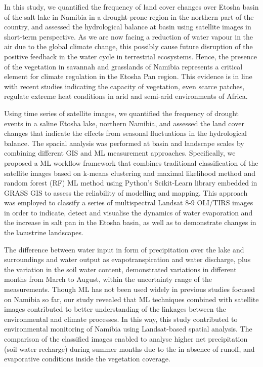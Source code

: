 \documentclass[climate,article,submit,pdftex,moreauthors]{Definitions/mdpi}
\begin{document}
{In this study, we quantified the frequency of land cover changes over Etosha basin of the salt lake in Namibia in a drought-prone region in the northern part of the country, and assessed the hydrological balance at basin using satellite images in short-term perspective. As we are now facing a reduction of water vapour in the air due to the global climate change, this possibly cause future disruption of the positive feedback in the water cycle in terrestrial ecosystems. Hence, the presence of the vegetation in savannah and grasslands of Namibia represents a critical element for climate regulation in the Etosha Pan region. This evidence is in line with recent studies indicating the capacity of vegetation, even scarce patches, regulate extreme heat conditions in arid and semi-arid environments of Africa.} 

{Using time series of satellite images, we quantified the frequency of drought events in a saline Etosha lake, northern Namibia, and assessed the land cover changes that indicate the effects from seasonal fluctuations in the hydrological balance. The spacial analysis was performed at basin and landscape scales by combining different GIS and ML measurement approaches.} Specifically, we{ proposed a }ML workflow framework that combines traditional classification of the satellite images based on k-means clustering and maximal likelihood method and random forest (RF) ML method using Python's Scikit-Learn library embedded in GRASS GIS to assess the reliability of modelling and mapping. This approach was employed to classify a series of multispectral Landsat 8-9 OLI/TIRS images in order to indicate, detect and visualise the dynamics of water evaporation and the increase in salt pan in the Etosha basin, as well as to demonstrate changes in the lacustrine landscapes{.} 

{The difference between water input in form of precipitation over the lake and surroundings and water output as evapotranspiration and water discharge, plus the variation in the soil water content, demonstrated variations in different months from March to August, within the uncertainty range of the measurements. Though ML  has not been used widely in previous studies focused on Namibia so far, our study revealed that ML techniques combined with satellite images contributed to better understanding of the linkages between the environmental and climate processes. In this way, this study contributed to environmental monitoring of Namibia using Landsat-based spatial analysis. The comparison of the classified images enabled to analyse higher net precipitation (soil water recharge) during summer months due to the in absence of runoff, and evaporative conditions inside the vegetation coverage.}
\end{document}
